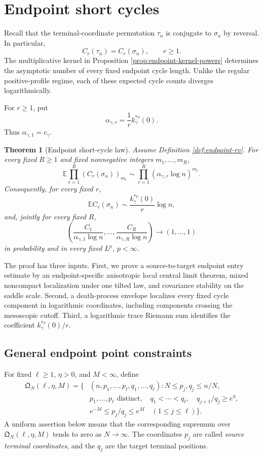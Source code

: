 \documentclass[11pt]{article}
\newtheorem{theorem}{Theorem}[section]
\theoremstyle{remark}
\newcommand{\Ee}{\mathbb E}
\begin{document}
\section{Endpoint short cycles}
\label{sec:endpoint-short-cycles}

Recall that the terminal-coordinate permutation $\tau_n$ is conjugate to
$\sigma_n$ by reversal.  In particular,
\[
        C_r(\tau_n)=C_r(\sigma_n),\qquad r\ge1.
\]
The multiplicative kernel in Proposition
\ref{prop:endpoint-kernel-powers} determines the asymptotic number of every
fixed endpoint cycle length.  Unlike the regular positive-profile regime, each
of these expected cycle counts diverges logarithmically.

For $r\ge1$, put
\[
        \alpha_{\gamma,r}=\frac1r k_\gamma^{*r}(0).
\]
Thus $\alpha_{\gamma,1}=c_\gamma$.

\begin{theorem}[Endpoint short-cycle law]
\label{thm:endpoint-short-cycles}
Assume Definition \ref{def:endpoint-rv}.  For every fixed $R\ge1$ and fixed
nonnegative integers $m_1,\ldots,m_R$,
\[
        \Ee\prod_{r=1}^R(C_r(\sigma_n))_{m_r}
        \sim\prod_{r=1}^R
        (\alpha_{\gamma,r}\log n)^{m_r}.
\]
Consequently, for every fixed $r$,
\[
        \Ee C_r(\sigma_n)
        \sim\frac{k_\gamma^{*r}(0)}r\log n,
\]
and, jointly for every fixed $R$,
\[
        \left(
        \frac{C_1}{\alpha_{\gamma,1}\log n},\ldots,
        \frac{C_R}{\alpha_{\gamma,R}\log n}
        \right)\longrightarrow(1,\ldots,1)
\]
in probability and in every fixed $L^p$, $p<\infty$.
\end{theorem}

The proof has three inputs.  First, we prove a source-to-target endpoint entry
estimate by an endpoint-specific anisotropic local central limit theorem,
mixed noncompact localization under one tilted law, and covariance stability
on the saddle scale.  Second, a death-process envelope localizes every fixed
cycle component in logarithmic coordinates, including components crossing the
mesoscopic cutoff.  Third, a logarithmic trace Riemann sum identifies the
coefficient $k_\gamma^{*r}(0)/r$.

\subsection{General endpoint point constraints}

For fixed $\ell\ge1$, $\eta>0$, and $M<\infty$, define
\[
\begin{aligned}
\mathfrak Q_N(\ell,\eta,M)=\bigl\{&(n,p_1,\ldots,p_\ell,
 q_1,\ldots,q_\ell):
 N\le p_j,q_j\le n/N,\\
& p_1,\ldots,p_\ell\text{ distinct},\quad
 q_1<\cdots<q_\ell,\quad
 q_{j+1}/q_j\ge e^\eta,\\
& e^{-M}\le p_j/q_j\le e^M\quad(1\le j\le\ell)
\bigr\}.
\end{aligned}
\tag{10.1}\label{eq:endpoint-point-admissible}
\]
A uniform assertion below means that the corresponding supremum over
$\mathfrak Q_N(\ell,\eta,M)$ tends to zero as $N\to\infty$.
The coordinates $p_j$ are called \emph{source terminal coordinates}, and the
$q_j$ are the target terminal positions.
\end{document}
